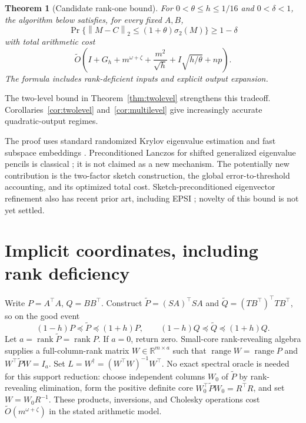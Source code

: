 \documentclass[11pt]{article}
\newtheorem{theorem}{Theorem}
\newcommand{\R}{\mathbb R}
\newcommand{\norm}[1]{\left\lVert#1\right\rVert}
\newcommand{\tO}{\widetilde O}
\newcommand{\rank}{\operatorname{rank}}
\newcommand{\range}{\operatorname{range}}
\begin{document}
\begin{theorem}[Candidate rank-one bound]\label{thm:main}
For \(0<\theta\leq h\leq1/16\) and \(0<\delta<1\), the
algorithm below satisfies, for every fixed \(A,B\),
\[
 \Pr\{\norm{M-C}_2\leq(1+\theta)\sigma_2(M)\}\geq1-\delta
\]
with total arithmetic cost
\begin{equation}\label{eq:cost}
 \tO\!\left(I+G_h+m^{\omega+\zeta}
              +\frac{m^2}{\sqrt h}
              +I\sqrt{h/\theta}+np\right).
\end{equation}
The formula includes rank-deficient inputs and explicit output expansion.
\end{theorem}

The two-level bound in Theorem~\ref{thm:twolevel} strengthens this tradeoff.
Corollaries~\ref{cor:twolevel} and~\ref{cor:multilevel} give increasingly
accurate quadratic-output regimes.

The proof uses standard randomized Krylov eigenvalue estimation \cite{jyz}
and fast subspace embeddings \cite{cnw}. Preconditioned Lanczos for shifted
generalized eigenvalue pencils is classical \cite{templates}; it is not claimed
as a new mechanism. The potentially new contribution is the two-factor
sketch construction, the global error-to-threshold accounting, and its optimized
total cost. Sketch-preconditioned eigenvector refinement also has recent prior
art, including EPSI \cite{epsi}; novelty of this bound is not yet settled.

\section{Implicit coordinates, including rank deficiency}
Write \(P=A^\top A\), \(Q=BB^\top\). Construct
\(\widetilde P=(SA)^\top SA\) and
\(\widetilde Q=(TB^\top)^\top TB^\top\), so on the good event
\begin{equation}\label{eq:ose}
 (1-h)P\preceq\widetilde P\preceq(1+h)P,\qquad
 (1-h)Q\preceq\widetilde Q\preceq(1+h)Q.
\end{equation}
Let \(a=\rank\widetilde P=\rank P\). If \(a=0\), return zero.
Small-core rank-revealing algebra supplies a full-column-rank matrix
\(W\in\R^{m\times a}\) such that
\(\range W=\range P\) and \(W^\top\widetilde P W=I_a\).
Set \(L=W^\dagger=(W^\top W)^{-1}W^\top\). No exact spectral
oracle is needed for this support reduction: choose independent columns
\(W_0\) of \(\widetilde P\) by rank-revealing elimination, form the
positive definite core \(W_0^\top\widetilde P W_0=R^\top R\), and set
\(W=W_0R^{-1}\). These products, inversions, and Cholesky operations
cost \(\tO(m^{\omega+\zeta})\) in the stated arithmetic model.
\end{document}

